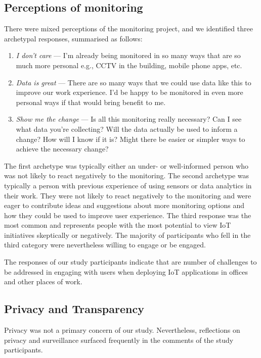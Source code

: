 \subsection{Perceptions of monitoring}
\label{sec:perc-monit}
There were mixed perceptions of the monitoring project, and we
identified three archetypal responses, summarised as follows: 

\begin{enumerate}
\item \textit{I don't care} --- I'm already being monitored in so many ways
  that are so much more personal e.g., CCTV in the building, mobile
  phone apps, etc. 
\item \textit{Data is great} --- There are so many ways that we could use
  data like this to improve our work experience. I'd
  be happy to be monitored in even more personal ways if that would
  bring benefit to me. 
\item \textit{Show me the change} --- Is all this monitoring really necessary?
  Can I see what data you’re collecting? Will the data actually be
  used to inform a change? How will I know if it is? Might there be
  easier or simpler ways to achieve the necessary change? 
\end{enumerate}

The first archetype was typically either an under- or well-informed
person who was not likely to react negatively to the monitoring. The
second archetype was typically a person with previous experience of
using sensors or data analytics in their work. They were not likely to
react negatively to the monitoring and were eager to contribute ideas
and suggestions about more monitoring options and how they could be
used to improve user experience. The third response was the most
common and represents people with the most potential to view IoT
initiatives skeptically or negatively. The majority of participants
who fell in the third category were nevertheless willing to engage or
be engaged.

The responses of our study participants
indicate that are number of challenges to be addressed in engaging
with users when deploying IoT applications in offices and other
places of work. 

\subsection{Privacy and Transparency}
\label{sec:privacy}

Privacy was not a primary concern of our study. Nevertheless,
reflections on privacy and surveillance surfaced frequently in the
comments of the study participants.


